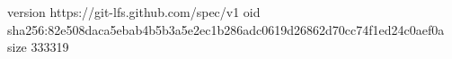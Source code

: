 version https://git-lfs.github.com/spec/v1
oid sha256:82e508daca5ebab4b5b3a5e2ec1b286adc0619d26862d70cc74f1ed24c0aef0a
size 333319
